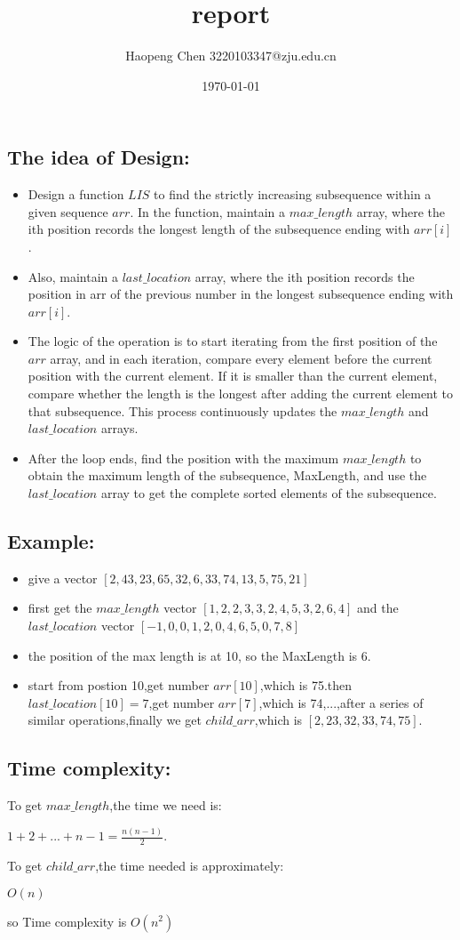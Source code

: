 \documentclass[a4paper]{article}
\begin{document}
\title{report}
\author{Haopeng Chen 3220103347@zju.edu.cn}
\date{\today}
\maketitle
\subsection*{The idea of Design:}
\begin{itemize}
\item Design a function $LIS$ to find the strictly increasing subsequence within a given sequence $arr$. In the function, maintain a $max\_length$ array, where the ith position records the longest length of the subsequence ending with $arr[i]$. 
\item Also, maintain a $last\_location$ array, where the ith position records the position in arr of the previous number in the longest subsequence ending with $arr[i]$. 
\item The logic of the operation is to start iterating from the first position of the $arr$ array, and in each iteration, compare every element before the current position with the current element. If it is smaller than the current element, compare whether the length is the longest after adding the current element to that subsequence. This process continuously updates the $max\_length$ and $last\_location$ arrays. 
\item After the loop ends, find the position with the maximum $max\_length$ to obtain the maximum length of the subsequence, MaxLength, and use the $last\_location$ array to get the complete sorted elements of the subsequence.
\end{itemize}


\subsection*{Example:}
\begin{itemize}
\item give a vector $[2,43,23,65,32,6,33,74,13,5,75,21]$
\item first get the $max\_length$ vector $[1,2,2,3,3,2,4,5,3,2,6,4]$ and the $last\_location$ vector $[-1,0,0,1,2,0,4,6,5,0,7,8]$
\item the position of the max length is at 10, so the MaxLength is 6.
\item start from postion 10,get number $arr[10]$,which is 75.then $last\_location[10] = 7$,get number $arr[7]$,which is 74,...,after a series of similar operations,finally we get $child\_arr$,which is $[2,23,32,33,74,75]$.
\end{itemize}

\subsection*{Time complexity:}
To get $max\_length$,the time we need is:
\begin{center}
	$1+2+...+n-1=\frac{n(n-1)}{2}.$
\end{center}
To get $child\_arr$,the time needed is approximately:
\begin{center}
	$O(n)$
\end{center}
so Time complexity is $O(n^{2})$
\end{document}
